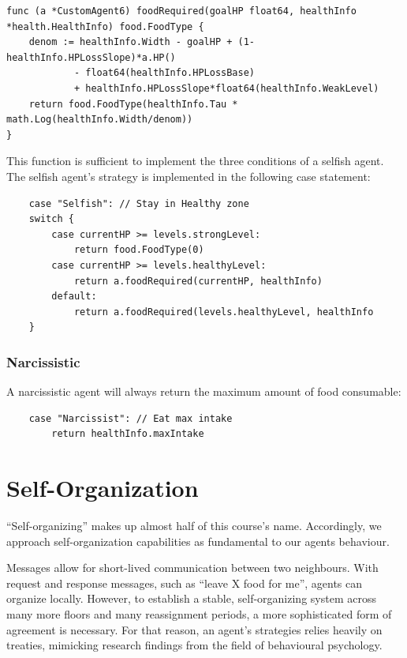 \begin{verbatim}
func (a *CustomAgent6) foodRequired(goalHP float64, healthInfo *health.HealthInfo) food.FoodType {
    denom := healthInfo.Width - goalHP + (1-healthInfo.HPLossSlope)*a.HP()
            - float64(healthInfo.HPLossBase) 
            + healthInfo.HPLossSlope*float64(healthInfo.WeakLevel)
    return food.FoodType(healthInfo.Tau * math.Log(healthInfo.Width/denom))
}
\end{verbatim}

This function is sufficient to implement the three conditions of a selfish agent. The selfish agent's strategy is implemented in the following case statement:

\begin{verbatim}
    case "Selfish": // Stay in Healthy zone
    switch {
        case currentHP >= levels.strongLevel:
            return food.FoodType(0)
        case currentHP >= levels.healthyLevel:
            return a.foodRequired(currentHP, healthInfo)
        default:
            return a.foodRequired(levels.healthyLevel, healthInfo
    }
\end{verbatim}

\subsubsection{Narcissistic}
A narcissistic agent will always return the maximum amount of food consumable:

\begin{verbatim}
    case "Narcissist": // Eat max intake
        return healthInfo.maxIntake
\end{verbatim}

\newpage

\section{Self-Organization}\label{self-organization}

“Self-organizing” makes up almost half of this course's name. Accordingly, we approach self-organization capabilities as fundamental to our agents behaviour.

Messages allow for short-lived communication between two neighbours. With request and response messages, such as “leave X food for me”, agents can organize locally. However, to establish a stable, self-organizing system across many more floors and many reassignment periods, a more sophisticated form of agreement is necessary. For that reason, an agent's strategies relies heavily on treaties, mimicking research findings from the field of behavioural psychology.

